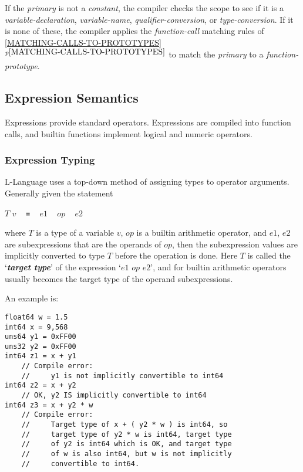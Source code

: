 \documentclass[12pt]{article}
\newcommand{\TT}[1]{{\tt \bfseries #1}}
\newcommand{\key}[1]{{\bf \em #1}\index{#1}}
\newcommand{\itemref}[1]{\ref{#1}$^{p\pageref{#1}}$}
\newenvironment{indpar}[1][0.3in]%
	{\begin{list}{}%
		     {\setlength{\itemsep}{0in}%
		      \setlength{\topsep}{0in}%
		      \setlength{\parsep}{1ex}%
		      \setlength{\labelwidth}{#1}%
		      \setlength{\leftmargin}{#1}%
		      \addtolength{\leftmargin}{\labelsep}}%
	 \item}%
	{\end{list}}
\begin{document}
If the {\em primary} is not a {\em constant}, the compiler
checks the scope to see if it is a {\em variable-declaration},
{\em variable-name}, {\em qualifier-conversion}, or
{\em type-conversion}.  If it is none of these, the
compiler applies the {\em function-call} matching rules of
\itemref{MATCHING-CALLS-TO-PROTOTYPES}
to match the {\em primary} to a {\em function-prototype}.

\subsection{Expression Semantics}

Expressions provide standard operators.  Expressions are compiled
into function calls, and builtin functions
implement logical and numeric operators.

\subsubsection{Expression Typing}
\label{EXPRESSION-TYPING}

L-Language uses a top-down method of assigning types to operator arguments.
Generally given the statement
\begin{center}
$T$ $v$ ~ \TT{=} ~ $e1$ ~ $op$ ~ $e2$
\end{center}
where $T$ is a type of a variable $v$,
$op$ is a builtin arithmetic operator,
and $e1$, $e2$ are subexpressions that are the operands of $op$, then
the subexpression values are implicitly converted to type $T$
before the operation is done.  Here $T$ is called the `\key{target type}'
of the expression `$e1$ $op$ $e2$', and for builtin arithmetic operators
usually becomes the target type of the operand subexpressions.

An example is:

\begin{indpar}\begin{verbatim}
float64 w = 1.5
int64 x = 9,568
uns64 y1 = 0xFF00
uns32 y2 = 0xFF00
int64 z1 = x + y1
    // Compile error:
    //     y1 is not implicitly convertible to int64
int64 z2 = x + y2
    // OK, y2 IS implicitly convertible to int64
int64 z3 = x + y2 * w
    // Compile error:
    //     Target type of x + ( y2 * w ) is int64, so
    //     target type of y2 * w is int64, target type
    //     of y2 is int64 which is OK, and target type
    //     of w is also int64, but w is not implicitly
    //     convertible to int64.
\end{verbatim}\end{indpar}
\end{document}
